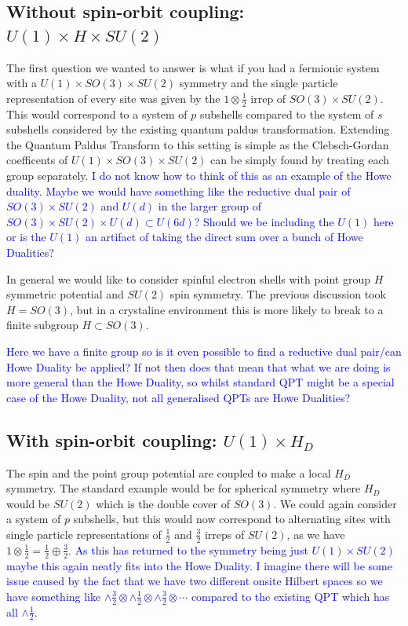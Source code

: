 \documentclass[aps,prx,twocolumn,floatfix,10pt,amssymb,amsfont,amsmath,superscriptaddress,float,nofootinbib,longbibliography,nobalancelastpage]{revtex4-2}
\begin{document}
\subsection{Without spin-orbit coupling: $U(1) \times H \times SU(2)$}
The first question we wanted to answer is what if you had a fermionic system with a $U(1) \times SO(3) \times SU(2)$ symmetry and the single particle representation of every site was given by the $1 \otimes \frac{1}{2}$ irrep of $SO(3) \times SU(2)$. This would correspond to a system of $p$ subshells compared to the system of $s$ subshells considered by the existing quantum paldus transformation. Extending the Quantum Paldus Transform to this setting is simple as the Clebsch-Gordan coefficents of $U(1) \times SO(3) \times SU(2)$ can be simply found by treating each group separately. 
\textcolor{blue}{I do not know how to think of this as an example of the Howe duality. Maybe we would have something like the reductive dual pair of $SO(3) \times SU(2)$ and $U(d)$ in the larger group of $SO(3) \times SU(2)\times U(d) \subset U(6d)$? Should we be including the $U(1)$ here or is the $U(1)$ an artifact of taking the direct sum over a bunch of Howe Dualities?}

In general we would like to consider spinful electron shells with point group $H$ symmetric potential and $SU(2)$ spin symmetry. The previous discussion took $H= SO(3)$, but in a crystaline environment this is more likely to break to a finite subgroup $H \subset SO(3)$.

\textcolor{blue}{Here we have a finite group so is it even possible to find a reductive dual pair/can Howe Duality be applied? If not then does that mean that what we are doing is more general than the Howe Duality, so whilst standard QPT might be a special case of the Howe Duality, not all generalised QPTs are Howe Dualities?}
\subsection{With spin-orbit coupling: $U(1) \times H_D$}
The spin and the point group potential are coupled to make a local $H_D$ symmetry. The standard example would be for spherical symmetry where $H_D$ would be $SU(2)$ which is the double cover of $SO(3)$. We could again consider a system of $p$ subshells, but this would now correspond to alternating sites with single particle representations of $\frac{1}{2}$ and $\frac{3}{2}$ irreps of $SU(2)$, as we have $1 \otimes \frac{1}{2} = \frac{1}{2}\oplus \frac{3}{2}$. \textcolor{blue}{As this has returned to the symmetry being just $U(1) \times SU(2)$ maybe this again neatly fits into the Howe Duality. I imagine there will be some issue caused by the fact that we have two different onsite Hilbert spaces so we have something like $\wedge \frac{3}{2} \otimes \wedge \frac{1}{2} \otimes \wedge \frac{3}{2} \otimes \cdots$ compared to the existing QPT which has all $\wedge \frac{1}{2}$.}

\end{document}

